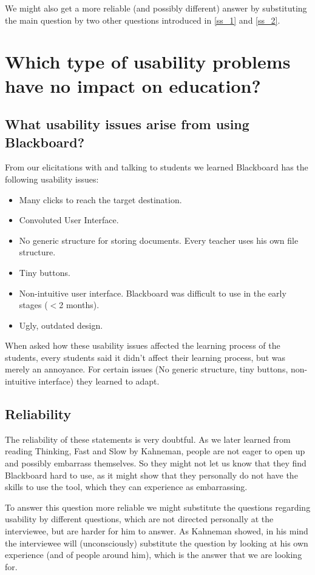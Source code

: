 We might also get a more reliable (and possibly different) answer by substituting the main question by two other questions introduced in \ref{ss_1} and \ref{ss_2}.


\section{Which type of usability problems have no impact on education?}
\label{s_1}

\subsection{What usability issues arise from using Blackboard?}
From our elicitations with and talking to students we learned Blackboard has the following usability issues:
\begin{itemize}
	\item Many clicks to reach the target destination.
	\item Convoluted User Interface.
	\item No generic structure for storing documents. Every teacher uses his own file structure.
	\item Tiny buttons.
	\item Non-intuitive user interface. Blackboard was difficult to use in the early stages ($<$2 months).
	\item Ugly, outdated design.
\end{itemize}

When asked how these usability issues affected the learning process of the students, every students said it didn't affect their learning process, but was merely an annoyance. For certain issues (No generic structure, tiny buttons, non-intuitive interface) they learned to adapt.

\subsection{Reliability}
The reliability of these statements is very doubtful. As we later learned from reading Thinking, Fast and Slow by Kahneman, people are not eager to open up and possibly embarrass themselves. So they might not let us know that they find Blackboard hard to use, as it might show that they personally do not have the skills to use the tool, which they can experience as embarrassing.

To answer this question more reliable we might substitute the questions regarding usability by different questions, which are not directed personally at the interviewee, but are harder for him to answer. As Kahneman showed, in his mind the interviewee will (unconsciously) substitute the question by looking at his own experience (and of people around him), which is the answer that we are looking for. 



